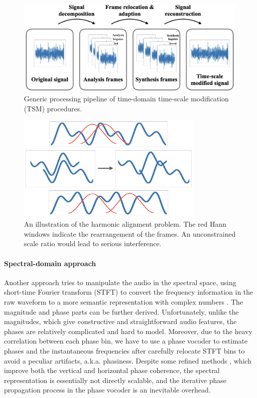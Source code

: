 \documentclass[12pt]{article}
\begin{document}
\begin{figure}
\begin{center}
  \includegraphics[width=.8\textwidth]{assets/figures/tsm-pipeline}
\end{center}
\caption{Generic processing pipeline of time-domain time-scale modification (TSM) procedures.}
\label{fig:tsm-pipeline}
\end{figure}

\begin{figure}
\begin{center}
  \includegraphics[width=0.8\textwidth]{assets/figures/harmonic-aligment}
\end{center}
\caption{An illustration of the harmonic alignment problem. The red Hann windows indicate the rearrangement of the frames. An unconstrained scale ratio would lead to serious interference.}
\label{fig:harmonic-alignment}
\end{figure}

\paragraph{Spectral-domain approach}
Another approach tries to manipulate the audio in the spectral space, using short-time Fourier transform (STFT) to convert the frequency information in the raw waveform to a more semantic representation with complex numbers \cite{lar99}. The magnitude and phase parts can be further derived. Unfortunately, unlike the magnitudes, which give constructive and straightforward audio features, the phases are relatively complicated and hard to model. Moreover, due to the heavy correlation between each phase bin, we have to use a phase vocoder \cite{fla66} to estimate phases and the instantaneous frequencies after carefully relocate STFT bins to avoid a peculiar artifacts, a.k.a. phasiness. Despite some refined methods \cite{kra12}\cite{moi11}\cite{nag09}, which improve both the vertical and horizontal phase coherence, the spectral representation is essentially not directly scalable, and the iterative phase propagation process in the phase vocoder is an inevitable overhead.
\end{document}
